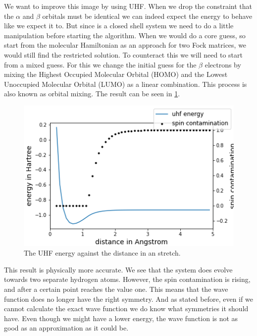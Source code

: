 \documentclass[twoside,twocolumn,9pt]{article}
\begin{document}
We want to improve this image by using UHF.  When we drop the constraint that the $\alpha$ and $\beta$ orbitals must be identical we can indeed expect the energy to behave like we expect
it to. But since  is a closed shell system we need to do a little manipulation before starting the algorithm. When we would do a core guess, so start from the molecular
Hamiltonian as an approach for two Fock matrices, we would still find the restricted solution. To counteract this we will need to start from a mixed guess. For this we change the initial
guess for the $\beta$ electrons by mixing the Highest Occupied Molecular Orbital (HOMO) and the Lowest Unoccupied Molecular Orbital (LUMO) as a linear combination. This process is also
known as orbital mixing. The result can be seen in \ref{fig:uhfstretch}.
\begin{center}
  \begin{figure}[h]
    \includegraphics[width=\linewidth]{./../notes/figures/uhf.png}
    \caption{The UHF energy against the distance in an  stretch.}
    \label{fig:uhfstretch}
  \end{figure}
\end{center}
This result is physically more accurate. We see that the system does evolve towards two separate hydrogen atoms. However, the spin contamination is rising, and after a certain point
reaches the value one. This means that the wave function does no longer have the right symmetry. And as stated before, even if we cannot calculate the exact wave function we do know
what symmetries it should have. Even though we might have a lower energy, the wave function is not as good as an approximation as it could be\cite{Scuseria2013}. \\
\end{document}
